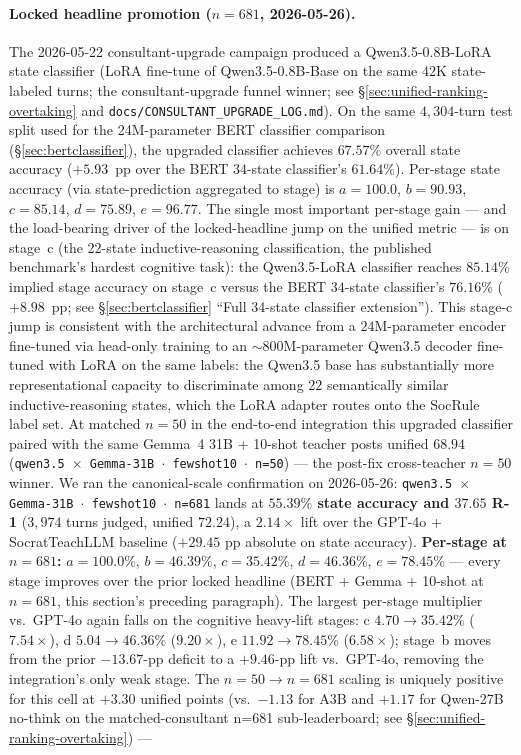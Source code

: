 \documentclass[11pt]{article}
\begin{document}
\paragraph{Locked headline promotion ($n{=}681$, 2026-05-26).} The 2026-05-22 consultant-upgrade campaign produced a Qwen3.5-0.8B-LoRA state classifier (LoRA fine-tune of Qwen3.5-0.8B-Base on the same $42$K state-labeled turns; the consultant-upgrade funnel winner; see \S\ref{sec:unified-ranking-overtaking} and \texttt{docs/CONSULTANT\_UPGRADE\_LOG.md}). On the same $4{,}304$-turn test split used for the 24M-parameter BERT classifier comparison (\S\ref{sec:bertclassifier}), the upgraded classifier achieves $\mathbf{67.57\%}$ overall state accuracy ($+5.93$~pp over the BERT $34$-state classifier's $61.64\%$). Per-stage state accuracy (via state-prediction aggregated to stage) is $a{=}100.0$, $b{=}90.93$, $c{=}\mathbf{85.14}$, $d{=}75.89$, $e{=}96.77$. The single most important per-stage gain --- and the load-bearing driver of the locked-headline jump on the unified metric --- is on stage~c (the 22-state inductive-reasoning classification, the published benchmark's hardest cognitive task): the Qwen3.5-LoRA classifier reaches $85.14\%$ implied stage accuracy on stage~c versus the BERT $34$-state classifier's $76.16\%$ ($\mathbf{+8.98}$~pp; see \S\ref{sec:bertclassifier} ``Full 34-state classifier extension''). This stage-c jump is consistent with the architectural advance from a $24$M-parameter encoder fine-tuned via head-only training to an $\sim$800M-parameter Qwen3.5 decoder fine-tuned with LoRA on the same labels: the Qwen3.5 base has substantially more representational capacity to discriminate among $22$ semantically similar inductive-reasoning states, which the LoRA adapter routes onto the SocRule label set. At matched $n{=}50$ in the end-to-end integration this upgraded classifier paired with the same Gemma~4 31B + 10-shot teacher posts unified $68.94$ (\texttt{qwen3.5 $\times$ Gemma-31B $\cdot$ fewshot10 $\cdot$ n=50}) --- the post-fix cross-teacher $n{=}50$ winner. We ran the canonical-scale confirmation on 2026-05-26: \texttt{qwen3.5 $\times$ Gemma-31B $\cdot$ fewshot10 $\cdot$ n=681} lands at \textbf{$\boldsymbol{55.39\%}$ state accuracy and $\boldsymbol{37.65}$ R-1} ($3{,}974$ turns judged, unified $\boldsymbol{72.24}$), a $\boldsymbol{2.14\times}$ lift over the GPT-4o + SocratTeachLLM baseline ($+29.45$ pp absolute on state accuracy). \textbf{Per-stage at $n{=}681$:} $a{=}100.0\%$, $b{=}46.39\%$, $c{=}35.42\%$, $d{=}46.36\%$, $e{=}78.45\%$ --- every stage improves over the prior locked headline (BERT + Gemma + 10-shot at $n{=}681$, this section's preceding paragraph). The largest per-stage multiplier vs.\ GPT-4o again falls on the cognitive heavy-lift stages: c $4.70\to 35.42\%$ ($\boldsymbol{7.54\times}$), d $5.04\to 46.36\%$ ($\boldsymbol{9.20\times}$), e $11.92\to 78.45\%$ ($6.58\times$); stage~b moves from the prior $-13.67$-pp deficit to a $+9.46$-pp lift vs.\ GPT-4o, removing the integration's only weak stage. The $n{=}50\to n{=}681$ scaling is uniquely positive for this cell at $+3.30$ unified points (vs.\ $-1.13$ for A3B and $+1.17$ for Qwen-27B no-think on the matched-consultant n=681 sub-leaderboard; see \S\ref{sec:unified-ranking-overtaking}) --- 
\end{document}
